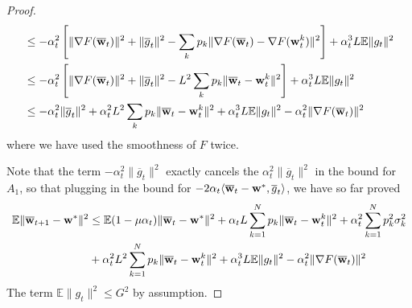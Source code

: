\begin{proof}
\begin{align*}
	& \leq-\alpha_{t}^{2}\left[\|\nabla F({\overline{\mathbf{w}}}_{t})\|^{2}+\|\overline{g}_{t}\|^{2}-\sum_{k}p_{k}\|\nabla F({\overline{\mathbf{w}}}_{t})-\nabla F({\mathbf{w}}_{t}^{k})\|^{2}\right]+\alpha_{t}^{3}L\mathbb{E}\|g_{t}\|^{2}\\
	& \leq-\alpha_{t}^{2}\left[\|\nabla F({\overline{\mathbf{w}}}_{t})\|^{2}+\|\overline{g}_{t}\|^{2}-L^{2}\sum_{k}p_{k}\|{\overline{\mathbf{w}}}_{t}-{\mathbf{w}}_{t}^{k}\|^{2}\right]+\alpha_{t}^{3}L\mathbb{E}\|g_{t}\|^{2}\\
	& \leq-\alpha_{t}^{2}\|\overline{g}_{t}\|^{2}+\alpha_{t}^{2}L^{2}\sum_{k}p_{k}\|{\overline{\mathbf{w}}}_{t}-{\mathbf{w}}_{t}^{k}\|^{2}+\alpha_{t}^{3}L\mathbb{E}\|g_{t}\|^{2}-\alpha_{t}^{2}\|\nabla F({\overline{\mathbf{w}}}_{t})\|^{2}
	\end{align*}
	where we have used the smoothness of $F$ twice. 
	
	Note that the term $-\alpha_{t}^{2}\|\overline{g}_{t}\|^{2}$ exactly
	cancels the $\alpha_{t}^{2}\|\overline{g}_{t}\|^{2}$ in the bound
	for $A_{1}$, so that plugging in the bound for $-2\alpha_{t}\langle{\overline{\mathbf{w}}}_{t}-{\mathbf{w}}^{\ast},\overline{g}_{t}\rangle$,
	we have so far proved 
	\begin{align*}
	\mathbb{E}\|{\overline{\mathbf{w}}}_{t+1}-{\mathbf{w}}^{\ast}\|^{2} & \leq\mathbb{E}(1-\mu\alpha_{t})\|{\overline{\mathbf{w}}}_{t}-{\mathbf{w}}^{\ast}\|^{2}+\alpha_{t}L\sum_{k=1}^{N}p_{k}\|{\overline{\mathbf{w}}}_{t}-{\mathbf{w}}_{t}^{k}\|^{2}+\alpha_{t}^{2}\sum_{k=1}^{N}p_{k}^{2}\sigma_{k}^{2}\\
	& +\alpha_{t}^{2}L^{2}\sum_{k=1}^{N}p_{k}\|{\overline{\mathbf{w}}}_{t}-{\mathbf{w}}_{t}^{k}\|^{2}+\alpha_{t}^{3}L\mathbb{E}\|g_{t}\|^{2}-\alpha_{t}^{2}\|\nabla F({\overline{\mathbf{w}}}_{t})\|^{2}
	\end{align*}
	The term $\mathbb{E}\|g_{t}\|^{2}\leq G^{2}$ by assumption. 
	

\end{proof}
